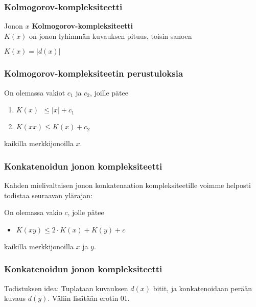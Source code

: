 \documentclass{beamer}
\newcommand{\bol}{\protect\textbf}
\begin{document}
  \begin{frame}
    \frametitle{Kolmogorov-kompleksiteetti}   
    
    \Large Jonon $x$ \bol{Kolmogorov-kompleksiteetti} \\ $K(x)$ on jonon lyhimm{\"a}n kuvauksen pituus, toisin sanoen

    \begin{center}
    		\huge $K(x) = |d(x)|$
    \end{center}
  \end{frame}   
  
   \begin{frame}
    \frametitle{Kolmogorov-kompleksiteetin perustuloksia}   
    \Large On olemassa vakiot $c_{1}$ ja $c_{2}$, joille p{\"a}tee
    
    \begin{enumerate}
    		\item $K(x) \: \: \le |x| + c_{1}$
    		\item $K(xx) \le K(x) + c_{2}$
    \end{enumerate}
    
	kaikilla merkkijonoilla $x$. 
    
   \end{frame}   
   
   \begin{frame}
    \frametitle{Konkatenoidun jonon kompleksiteetti} 
	\Large Kahden mielivaltaisen jonon konkatenaation kompleksiteetille voimme helposti todistaa seuraavan yl{\"a}rajan:
	
	\vspace{7mm}
	
	\Large On olemassa vakio $c$, jolle p{\"a}tee
	
	\begin{itemize}
		\item $K(xy) \le 2\cdot K(x) + K(y) + c$
	\end{itemize}
	
	\vspace{2mm}	
	
	kaikilla merkkijonoilla $x$ ja $y$.
   \end{frame}  
   
   \begin{frame}
    \frametitle{Konkatenoidun jonon kompleksiteetti}    
    
    \Large Todistuksen idea: Tuplataan kuvauksen $d(x)$ bitit, ja konkatenoidaan per{\"a}{\"a}n kuvaus $d(y)$. V{\"a}liin lis{\"a}t{\"a}{\"a}n erotin 01.

	\vspace{3mm}    
    \Large {}
  
   \end{frame}    
   
\end{document}
